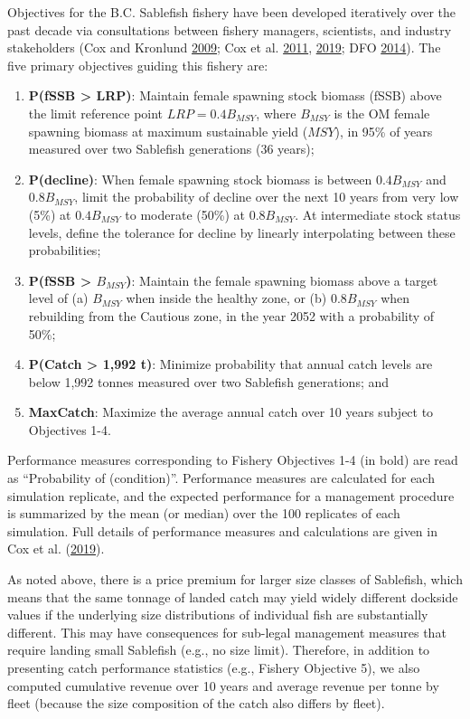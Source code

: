 \documentclass[11pt]{book}
\begin{document}
Objectives for the B.C. Sablefish fishery have been developed iteratively over the past decade via consultations between fishery managers, scientists, and industry stakeholders (Cox and Kronlund \protect\hyperlink{ref-cox2009evaluation}{2009}; Cox et al. \protect\hyperlink{ref-cox2011management}{2011}, \protect\hyperlink{ref-cox2019evaluating}{2019}; DFO \protect\hyperlink{ref-dfo2014performanc}{2014}). The five primary objectives guiding this fishery are:
\begin{enumerate}
\def\labelenumi{\arabic{enumi}.}

\item
  \textbf{P(fSSB \textgreater{} LRP)}: Maintain female spawning stock biomass (fSSB) above the limit reference point \(LRP = 0.4B_{MSY}\), where \(B_{MSY}\) is the OM female spawning biomass at maximum sustainable yield (\(MSY\)), in 95\% of years measured over two Sablefish generations (36 years);
\item
  \textbf{P(decline)}: When female spawning stock biomass is between \(0.4B_{MSY}\) and \(0.8B_{MSY}\), limit the probability of decline over the next 10 years from very low (5\%) at \(0.4B_{MSY}\) to moderate (50\%) at \(0.8B_{MSY}\). At intermediate stock status levels, define the tolerance for decline by linearly interpolating between these probabilities;
\item
  \textbf{P(fSSB \textgreater{} \(B_{MSY}\))}: Maintain the female spawning biomass above a target level of (a) \(B_{MSY}\) when inside the healthy zone, or (b) \(0.8B_{MSY}\) when rebuilding from the Cautious zone, in the year 2052 with a probability of 50\%;
\item
  \textbf{P(Catch \textgreater{} 1,992 t)}: Minimize probability that annual catch levels are below 1,992 tonnes measured over two Sablefish generations; and
\item
  \textbf{MaxCatch}: Maximize the average annual catch over 10 years subject to Objectives 1-4.
\end{enumerate}
Performance measures corresponding to Fishery Objectives 1-4 (in bold) are read as ``Probability of (condition)''. Performance measures are calculated for each simulation replicate, and the expected performance for a management procedure is summarized by the mean (or median) over the 100 replicates of each simulation. Full details of performance measures and calculations are given in Cox et al. (\protect\hyperlink{ref-cox2019evaluating}{2019}).

As noted above, there is a price premium for larger size classes of Sablefish, which means that the same tonnage of landed catch may yield widely different dockside values if the underlying size distributions of individual fish are substantially different. This may have consequences for sub-legal management measures that require landing small Sablefish (e.g., no size limit). Therefore, in addition to presenting catch performance statistics (e.g., Fishery Objective 5), we also computed cumulative revenue over 10 years and average revenue per tonne by fleet (because the size composition of the catch also differs by fleet).
\end{document}

